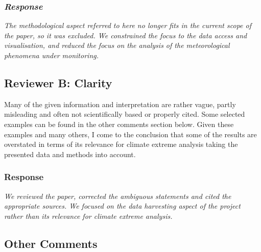 \documentclass[a4paper, 12pt, conference]{ieeeconf}      %
\begin{document}
	\subsubsection{\textbf{\emph{Response}}}
	\emph{The methodological aspect referred to here no longer fits in the current scope of the paper, so it was excluded. We constrained the focus to the data access and visualisation, and reduced the focus on the analysis of the meteorological phenomena under monitoring.}
	

	

\subsection{\textbf{Reviewer B:} Clarity}	Many of the given information and interpretation are rather vague, partly misleading and often not scientifically based or properly cited. Some selected examples can be found in the other comments section below. Given these examples and many others, I come to the conclusion that some of the results are overstated in terms of its relevance for climate extreme analysis taking the presented data and methods into account.
	
	\subsubsection{\textbf{Response}}
    \emph{	We reviewed the paper, corrected the ambiguous statements and cited the appropriate sources. We focused on the data harvesting aspect of the project rather than its relevance for climate extreme analysis.}
	
	\subsection{Other Comments}
\end{document}
